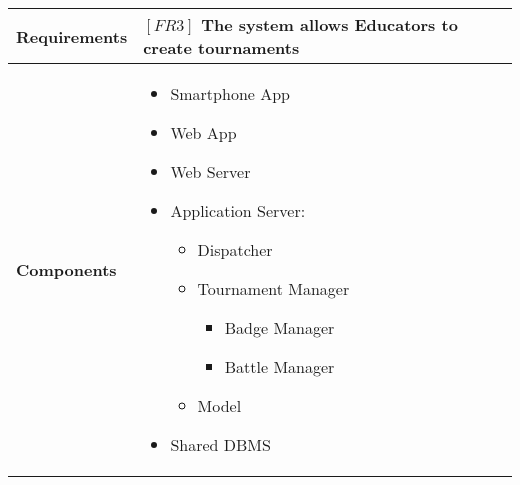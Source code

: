 \documentclass{article}
\begin{document}
\begin{table}[H]
 \renewcommand{\arraystretch}{1.5}
    \centering
    \begin{tabular}{|l|p{10cm}|}
        \hline
        \textbf{Requirements} & $[FR3]$ The system allows Educators to create tournaments \\
        \hline
        \textbf{Components} & 
        \begin{itemize}[align=left, topsep=0pt, partopsep=0pt]
            \item Smartphone App
            \item Web App
            \item Web Server
            \item Application Server:
            \begin{itemize}
                \item Dispatcher
                \item Tournament Manager
                \begin{itemize}
                    \item Badge Manager
                    \item Battle Manager
                \end{itemize}
                \item Model
            \end{itemize}
            \item Shared DBMS 
        \end{itemize} \\
        \hline
    \end{tabular}
\end{table}
\end{document}
